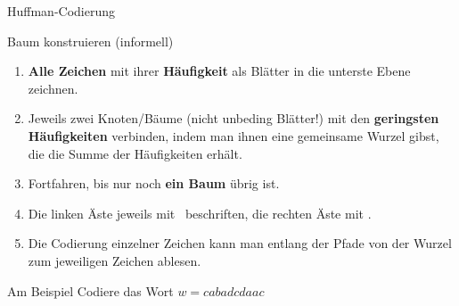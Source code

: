 \begin{frame}{Huffman-Codierung}
	\begin{block}{Baum konstruieren (informell)}
		\begin{enumerate}
			\item \textbf{Alle Zeichen} mit ihrer \textbf{Häufigkeit} als Blätter in die unterste Ebene zeichnen.
			\item Jeweils zwei Knoten/Bäume (nicht unbeding Blätter!) mit den \textbf{geringsten Häufigkeiten} verbinden, indem man ihnen eine gemeinsame Wurzel gibst, die die Summe der Häufigkeiten erhält.
			\item Fortfahren, bis nur noch \textbf{ein Baum} übrig ist.
			\item Die linken Äste jeweils mit \bzero \ beschriften, die rechten Äste mit \bone.
			\item Die Codierung einzelner Zeichen kann man entlang der Pfade von der Wurzel zum jeweiligen Zeichen ablesen.
		\end{enumerate}
	\end{block}
	\begin{exampleblock}{Am Beispiel}
		Codiere das Wort $w= cabadcdaac $
	\end{exampleblock}
\end{frame}


